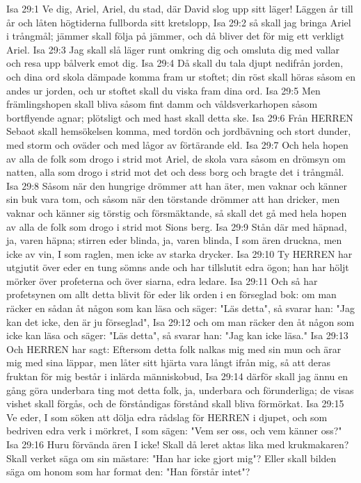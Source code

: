 Isa 29:1  Ve dig, Ariel, Ariel, du stad, där David slog upp sitt läger! Läggen år till år och låten högtiderna fullborda sitt kretslopp,
Isa 29:2  så skall jag bringa Ariel i trångmål; jämmer skall följa på jämmer, och då bliver det för mig ett verkligt Ariel.
Isa 29:3  Jag skall slå läger runt omkring dig och omsluta dig med vallar och resa upp bålverk emot dig.
Isa 29:4  Då skall du tala djupt nedifrån jorden, och dina ord skola dämpade komma fram ur stoftet; din röst skall höras såsom en andes ur jorden, och ur stoftet skall du viska fram dina ord.
Isa 29:5  Men främlingshopen skall bliva såsom fint damm och våldsverkarhopen såsom bortflyende agnar; plötsligt och med hast skall detta ske.
Isa 29:6  Från HERREN Sebaot skall hemsökelsen komma, med tordön och jordbävning och stort dunder, med storm och oväder och med lågor av förtärande eld.
Isa 29:7  Och hela hopen av alla de folk som drogo i strid mot Ariel, de skola vara såsom en drömsyn om natten, alla som drogo i strid mot det och dess borg och bragte det i trångmål.
Isa 29:8  Såsom när den hungrige drömmer att han äter, men vaknar och känner sin buk vara tom, och såsom när den törstande drömmer att han dricker, men vaknar och känner sig törstig och försmäktande, så skall det gå med hela hopen av alla de folk som drogo i strid mot Sions berg.
Isa 29:9  Stån där med häpnad, ja, varen häpna; stirren eder blinda, ja, varen blinda, I som ären druckna, men icke av vin, I som raglen, men icke av starka drycker.
Isa 29:10  Ty HERREN har utgjutit över eder en tung sömns ande och har tillslutit edra ögon; han har höljt mörker över profeterna och över siarna, edra ledare.
Isa 29:11  Och så har profetsynen om allt detta blivit för eder lik orden i en förseglad bok: om man räcker en sådan åt någon som kan läsa och säger: "Läs detta", så svarar han: "Jag kan det icke, den är ju förseglad",
Isa 29:12  och om man räcker den åt någon som icke kan läsa och säger: "Läs detta", så svarar han: "Jag kan icke läsa."
Isa 29:13  Och HERREN har sagt: Eftersom detta folk nalkas mig med sin mun och ärar mig med sina läppar, men låter sitt hjärta vara långt ifrån mig, så att deras fruktan för mig består i inlärda människobud,
Isa 29:14  därför skall jag ännu en gång göra underbara ting mot detta folk, ja, underbara och förunderliga; de visas vishet skall förgås, och de förståndigas förstånd skall bliva förmörkat.
Isa 29:15  Ve eder, I som söken att dölja edra rådslag för HERREN i djupet, och som bedriven edra verk i mörkret, I som sägen: "Vem ser oss, och vem känner oss?"
Isa 29:16  Huru förvända ären I icke! Skall då leret aktas lika med krukmakaren? Skall verket säga om sin mästare: "Han har icke gjort mig"? Eller skall bilden säga om honom som har format den: "Han förstår intet"?
